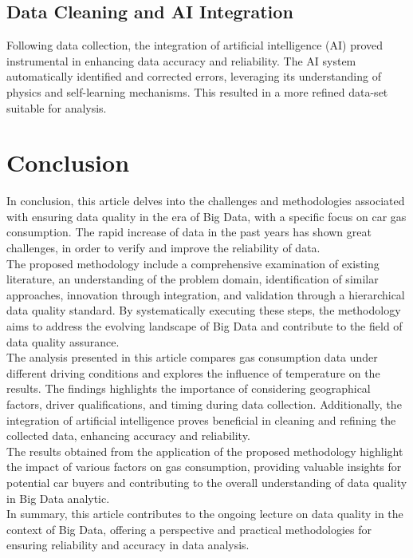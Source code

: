 \documentclass[10pt,a4paper]{article}
\begin{document}
\subsection{Data Cleaning and AI Integration}

Following data collection, the integration of artificial intelligence (AI) proved instrumental in enhancing data accuracy and reliability. The AI system automatically identified and corrected errors, leveraging its understanding of physics and self-learning mechanisms. This resulted in a more refined data-set suitable for analysis.



\section{Conclusion}

In conclusion, this article delves into the challenges and methodologies associated with ensuring data quality in the era of Big Data, with a specific focus on car gas consumption. The rapid increase of data in the past years has shown great challenges, in order to verify and improve the reliability of data.
\\
The proposed methodology include a comprehensive examination of existing literature, an understanding of the problem domain, identification of similar approaches, innovation through integration, and validation through a hierarchical data quality standard. By systematically executing these steps, the methodology aims to address the evolving landscape of Big Data and contribute to the field of data quality assurance.
\\
The analysis presented in this article compares gas consumption data under different driving conditions and explores the influence of temperature on the results. The findings highlights the importance of considering geographical factors, driver qualifications, and timing during data collection. Additionally, the integration of artificial intelligence proves beneficial in cleaning and refining the collected data, enhancing accuracy and reliability.
\\
The results obtained from the application of the proposed methodology highlight the impact of various factors on gas consumption, providing valuable insights for potential car buyers and contributing to the overall understanding of data quality in Big Data analytic.
\\
In summary, this article contributes to the ongoing lecture on data quality in the context of Big Data, offering a perspective and practical methodologies for ensuring reliability and accuracy in data analysis.
\end{document}
